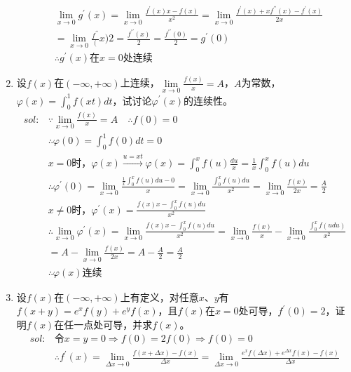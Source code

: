 \begin{enumerate}[{例}1.]
\begin{align*}
                    &\lim_{x\to 0}g^{\prime}(x)=\lim_{x\to 0}\frac{f^{\prime}(x)x-f(x)}{x^2}=\lim_{x\to 0}\frac{f^{\prime}(x)+xf^{\prime\prime}(x)-f^{\prime}(x)}{2x}\\
                    &=\lim_{x\to 0}\frac{f^{\prime\prime}}(x){2}=\frac{f^{\prime\prime}(x)}{2}=\frac{f^{\prime\prime}(0)}{2}=g^{\prime}(0)\\
                    &\therefore g^{\prime}(x)\mbox{在}x=0\mbox{处连续}
            \end{align*}
    \item 设$f(x)$在$(-\infty,+\infty)$上连续，$\lim\limits_{x \to 0}\frac{f(x)}{x}=A$，$A$为常数，$\varphi(x)=\int_0^1 f(xt)dt$，试讨论$\varphi^{\prime}(x)$的连续性。
        \begin{align*}
            sol:&\because\lim_{x\to 0}\frac{f(x)}{x}=A\quad\therefore f(0)=0\\
                &\therefore\varphi(0)=\int_0^1f(0)dt=0\\
                &x=0\mbox{时，}\varphi(x)\xrightarrow{u=xt}\varphi(x)=\int_0^xf(u)\frac{du}{x}=\frac{1}{x}\int_0^xf(u)du\\
                &\therefore\varphi^{\prime}(0)=\lim_{x\to 0}\frac{\frac{1}{x}\int_0^xf(u)du-0}{x}=\lim_{x\to 0}\frac{\int_0^xf(u)du}{x^2}=\lim_{x\to 0}\frac{f(x)}{2x}=\frac{A}{2}\\
                &x\neq 0\mbox{时，}\varphi^{\prime}(x)=\frac{f(x)x-\int_0^xf(u)du}{x^2}\\
                &\therefore\lim_{x\to 0}\varphi^{\prime}(x)=\lim_{x\to 0}\frac{f(x)x-\int_0^xf(u)du}{x^2}=\lim_{x\to 0}\frac{f(x)}{x}-\lim_{x\to 0}\frac{\int_0^xf(udu)}{x^2}\\
                &=A-\lim_{x\to 0}\frac{f(x)}{2x}=A-\frac{A}{2}=\frac{A}{2}\\
                &\therefore\varphi(x)\mbox{连续}
        \end{align*}
    \item 设$f(x)$在$(-\infty,+\infty)$上有定义，对任意$x$、$y$有$f(x+y)=e^xf(y)+e^yf(x)$，且$f(x)$在$x=0$处可导，$f^{\prime}(0)=2$，证明$f(x)$在任一点处可导，并求$f(x)$。
        \begin{align*}
            sol:&\mbox{令}x=y=0\Rightarrow f(0)=2f(0)\Rightarrow f(0)=0\\
                &\therefore f^{\prime}(x)=\lim_{\Delta x\to 0}\frac{f(x+\Delta x)-f(x)}{\Delta x}=\lim_{\Delta x\to 0}\frac{e^xf(\Delta x)+e^{\Delta x}f(x)-f(x)}{\Delta x}
        \end{align*}

\end{enumerate}
